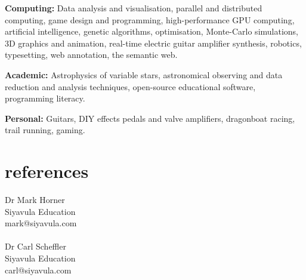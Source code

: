 \documentclass[]{friggeri-cv} %
\begin{document}
\textbf{Computing:} Data analysis and visualisation, parallel and distributed computing, game design and programming, high-performance GPU computing, artificial intelligence, genetic algorithms, optimisation, Monte-Carlo simulations, 3D graphics and animation, real-time electric guitar amplifier synthesis, robotics, typesetting, web annotation, the semantic web.

\textbf{Academic:} Astrophysics of variable stars, astronomical observing and data reduction and analysis techniques, open-source educational software, programming literacy.

\textbf{Personal:} Guitars, DIY effects pedals and valve amplifiers, dragonboat racing, trail running, gaming.



\section{references}

Dr Mark Horner\\
Siyavula Education\\
mark@siyavula.com\\
\\
Dr Carl Scheffler\\
Siyavula Education\\
carl@siyavula.com\\
\end{document}
